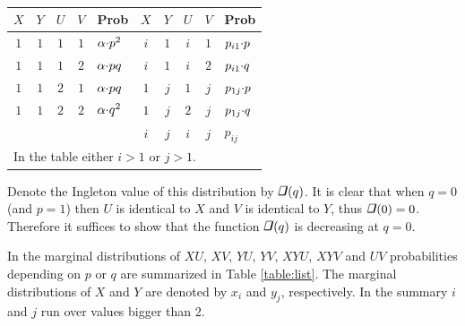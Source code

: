 \documentclass{IEEEtran}
\newcommand\ing{\begin{tikzpicture}[scale=0.13\ht\strutbox]%
        \draw[line width=0.015cm](0,0)--(0.055,0.22)--(0.22,0.22);
        \draw[line width=0.035cm](0.22,0.22)--(0.165,0);
        \draw[line width=0.025cm](0.165,0)--(0,0);
   \end{tikzpicture}}
\begin{document}
\begin{table}[htb]
\begin{center}
\begin{tabular}{@{}|c@{}c@{}c@{}cl@{\quad}|@{\quad}c@{}c@{}c@{}cl|}
\hline\rule{0pt}{9pt}%
$X$&$ Y$&$ U$&$ V$& Prob &%
$X$&$ Y$&$ U$&$ V$& Prob \\
\hline\rule{0pt}{10pt}%
$1$&$1$&$1$&$1$ & $\alpha{\cdot} p^2$ & $i$&$1$&$i$&$1$ & $p_{i1}{\cdot} p$\\
$1$&$1$&$1$&$2$ & $\alpha{\cdot} pq$  & $i$&$1$&$i$&$2$ & $p_{i1}{\cdot} q$\\
$1$&$1$&$2$&$1$ & $\alpha{\cdot} pq$  & $1$&$j$&$1$&$j$ & $p_{1j}{\cdot} p$\\
$1$&$1$&$2$&$2$ & $\alpha{\cdot} q^2$ & $1$&$j$&$2$&$j$ & $p_{1j}{\cdot} q$\\[1pt]
& & & & &$i$&$j$&$i$&$j$ & $p_{ij}$\\[2pt]
\hline
\multicolumn{10}{l}{\rule{0pt}{9pt}In the table either $i>1$ or $j>1$.}
\end{tabular}\end{center}
\caption{}\label{table:dist}
\end{table}

Denote the Ingleton value of this distribution by $\ing(q)$. It is clear
that when $q=0$ (and $p=1$) then $U$ is identical to $X$ and $V$ is
identical to $Y$, thus $\ing(0)=0$. Therefore it suffices to show that the
function $\ing(q)$ is decreasing at $q=0$.

In the marginal distributions of $XU$, $XV$, $YU$, $YV$, $XYU$, $XYV$ and
$UV$ probabilities depending on $p$ or $q$ are summarized in Table
\ref{table:list}. The marginal distributions of $X$ and $Y$ are denoted by
$x_i$ and $y_j$, respectively. In the summary $i$ and $j$ run over values
bigger than 2.
\end{document}
